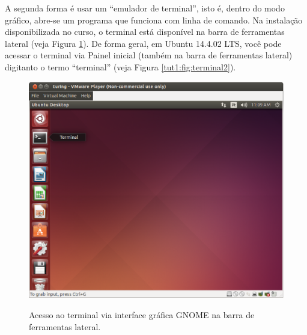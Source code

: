 \begin{refsection}

A segunda forma é usar um ``emulador de terminal'', isto é, dentro do modo gráfico, abre-se um programa que funciona com linha de comando. Na instalação disponibilizada no curso, o terminal está disponível na barra de ferramentas lateral (veja Figura \ref{tut1:fig:terminal1}). De forma geral, em Ubuntu 14.4.02 LTS, você pode acessar o terminal via Painel inicial (também na barra de ferramentas lateral) digitanto o termo ``terminal'' (veja Figura \ref{tut1:fig:terminal2}).\\

  \begin{figure}[H]
      {\includegraphics[scale=0.35]{figures/tut1/terminal1.eps}}
      {\caption[\textit{Acesso ao terminal via interface gráfica GNOME}]{Acesso ao terminal via interface gráfica GNOME na barra de ferramentas lateral.}\label{tut1:fig:terminal1}}
  \end{figure}



\end{refsection}
